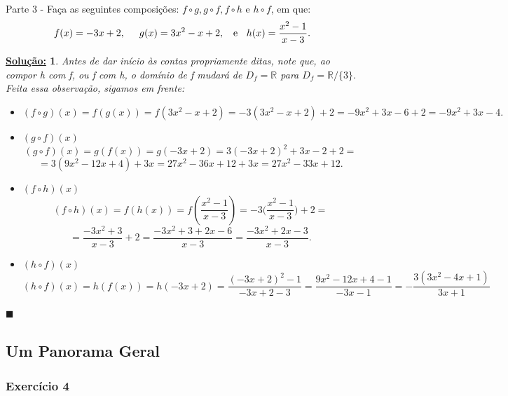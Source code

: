 \documentclass{article}
\newtheorem*{sol*}{\underline{Solu\c c\~ao:}}
\renewcommand\qedsymbol{$\blacksquare$}
\begin{document}
\paragraph{}Parte 3 - Fa\c ca as seguintes composi\c c\~oes: $f\circ{g}, g\circ{f}, f\circ{h} \text{ e } h\circ{f}$, em que:
$$
	f(x) = -3x + 2, \hspace{0.5cm} g(x) = 3x^2 - x  + 2, \hspace{0.2cm} \text{ e } \hspace{0.2cm} h(x) = \frac{x^2 - 1}{x - 3}.
$$
\begin{sol*}
	Antes de dar in\'icio \`as contas propriamente ditas, note que, ao compor h com f, ou f com h, o dom\'inio de f mudar\'a de $D_f = \mathbb{R}$ para $D_f = \mathbb{R}/\{3\}.$ Feita essa observa\c c\~ao, sigamos em frente:
	\begin{itemize}
		\item[i)]$$(f\circ{g})(x) = f(g(x)) = f(3x^2 - x + 2) = -3(3x^2 - x + 2) + 2 = -9x^2 + 3x - 6 + 2 = -9x^2 + 3x - 4.$$
		\item[ii)]$(g\circ{f})(x)$
		      $$
			      (g\circ{f})(x) = g(f(x)) = g(-3x + 2) = 3(-3x + 2)^2 +3x - 2 + 2 =
		      $$
		      $$
			      = 3(9x^2 - 12x + 4) + 3x = 27x^2 - 36x + 12 + 3x = 27x^2 - 33x + 12.
		      $$
		\item[iii)]$(f\circ{h})(x)$
		      $$
			      (f\circ{h})(x) = f(h(x)) = f(\frac{x^2 - 1}{x - 3}) = -3\biggl(\frac{x^2 - 1}{x - 3}\biggr) + 2 =
		      $$
		      $$
			      = \frac{-3x^2 + 3}{x-3} + 2 = \frac{-3x^2 + 3 + 2x - 6}{x-3} = \frac{-3x^2 + 2x -3}{x-3}.
		      $$
		\item[iv)]$(h\circ{f})(x) $
		      $$
			      (h\circ{f})(x) = h(f(x)) = h(-3x + 2) = \frac{(-3x + 2)^2 - 1}{-3x+2 - 3} = \frac{9x^2 -12x + 4 - 1}{-3x -1} = -\frac{3(3x^2 - 4x + 1)}{3x+1}
		      $$
	\end{itemize}
	\qedsymbol
\end{sol*}
\subsection{Um Panorama Geral}
\subsubsection{Exerc\'icio 4}
\end{document}
